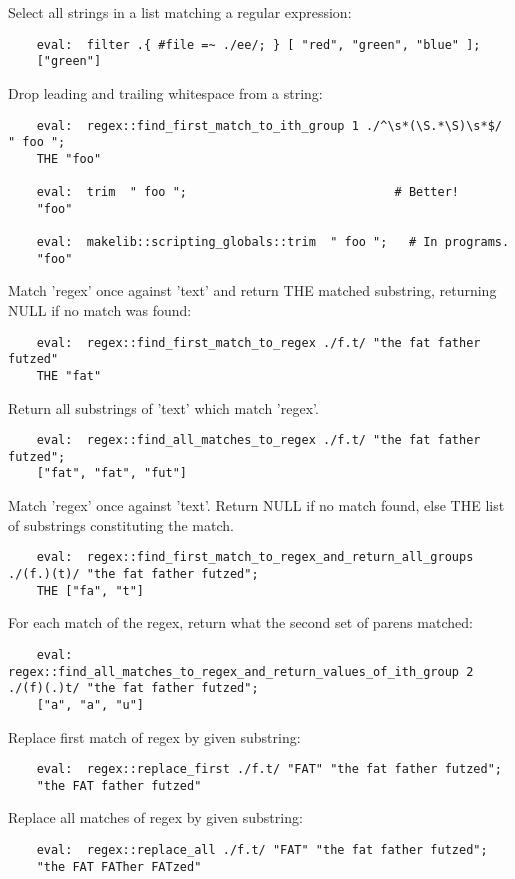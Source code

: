 Select all strings in a list matching a regular expression:
\begin{verbatim}
    eval:  filter .{ #file =~ ./ee/; } [ "red", "green", "blue" ];
    ["green"]
\end{verbatim}

Drop leading and trailing whitespace from a string:
\begin{verbatim}
    eval:  regex::find_first_match_to_ith_group 1 ./^\s*(\S.*\S)\s*$/ " foo ";
    THE "foo"

    eval:  trim  " foo ";                             # Better!
    "foo"

    eval:  makelib::scripting_globals::trim  " foo ";   # In programs.
    "foo"
\end{verbatim}


Match 'regex' once against 'text' and return {\sc THE} matched substring,
returning {\sc NULL} if no match was found:
\begin{verbatim}
    eval:  regex::find_first_match_to_regex ./f.t/ "the fat father futzed"
    THE "fat" 
\end{verbatim}


Return all substrings of 'text' which match 'regex'.
\begin{verbatim}
    eval:  regex::find_all_matches_to_regex ./f.t/ "the fat father futzed"; 
    ["fat", "fat", "fut"]
\end{verbatim}

Match 'regex' once against 'text'. 
Return {\sc NULL} if no match found, 
else {\sc THE} list of substrings 
constituting the match.
\begin{verbatim}
    eval:  regex::find_first_match_to_regex_and_return_all_groups ./(f.)(t)/ "the fat father futzed";
    THE ["fa", "t"]
\end{verbatim}

For each match of the regex, return what the second 
set of parens matched:
\begin{verbatim}
    eval:  regex::find_all_matches_to_regex_and_return_values_of_ith_group 2 ./(f)(.)t/ "the fat father futzed";
    ["a", "a", "u"]
\end{verbatim}

Replace first match of regex by given substring:
\begin{verbatim}
    eval:  regex::replace_first ./f.t/ "FAT" "the fat father futzed";
    "the FAT father futzed"
\end{verbatim}

Replace all matches of regex by given substring:
\begin{verbatim}
    eval:  regex::replace_all ./f.t/ "FAT" "the fat father futzed";
    "the FAT FATher FATzed"
\end{verbatim}

